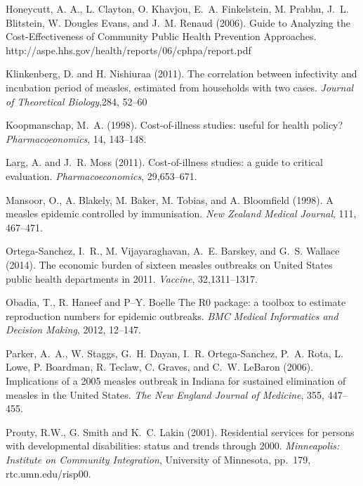 \documentclass{article}
\begin{document}
\begin{itemize}
\begin{thebibliography}{}
Honeycutt, A. A., L. Clayton, O. Khavjou, E.~A. Finkelstein, M. Prabhu, J.~L. Blitstein, W. Dougles Evans, and J.~M. Renaud (2006).
\newblock Guide to Analyzing the Cost-Effectiveness of Community Public Health Prevention Approaches.
http://aspe.hhs.gov/health/reports/06/cphpa/report.pdf

Klinkenberg, D. and H. Nishiuraa (2011).
\newblock The correlation between infectivity and incubation period of measles, estimated from households with two cases.
\newblock \emph{Journal of Theoretical Biology},284, 52--60

Koopmanschap, M.~A. (1998).
\newblock Cost-of-illness studies: useful for health policy?
\newblock \emph{Pharmacoeonomics}, 14, 143--148.

Larg, A. and J.~R. Moss (2011).
\newblock Cost-of-illness studies: a guide to critical evaluation.
\newblock \emph{Pharmacoeconomics}, 29,653--671.

Mansoor, O., A. Blakely, M. Baker, M. Tobias, and A. Bloomfield (1998).
\newblock A measles epidemic controlled by immunisation. 
\newblock \emph{New Zealand Medical Journal}, 111, 467--471.

Ortega-Sanchez, I.~R., M. Vijayaraghavan, A.~E. Barskey, and G.~S. Wallace (2014).
\newblock The economic burden of sixteen measles outbreaks on United States public health departments in 2011.
\newblock \emph{Vaccine}, 32,1311--1317.

Obadia, T., R. Haneef and P--Y. Boelle
\newblock The R0 package: a toolbox to estimate reproduction numbers for epidemic outbreaks.
\newblock \emph{BMC Medical Informatics and Decision Making}, 2012, 12--147.

Parker, A.~A., W. Staggs, G.~H. Dayan, I.~R. Ortega-Sanchez, P.~A. Rota, L. Lowe, P. Boardman, R. Teclaw, C. Graves, and C.~W. LeBaron (2006).
\newblock Implications of a 2005 measles outbreak in Indiana for sustained elimination of measles in the United States.
\newblock \emph{The New England Journal of Medicine}, 355, 447--455.

Prouty, R.W., G. Smith and K.~C. Lakin (2001).
\newblock Residential services for persons with developmental disabilities: status and trends through 2000.
\newblock \emph{Minneapolis: Institute on Community Integration}, University of Minnesota, pp.~179, rtc.umn.edu/risp00.


\end{thebibliography}
\end{itemize}
\end{document}
